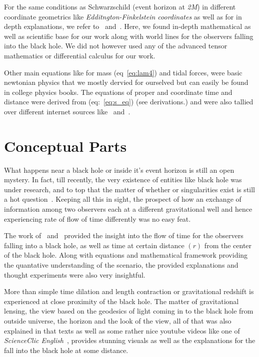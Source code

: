 For the same conditions as Schwarzschild (event horizon at \emph{2M}) in different coordinate geometrics like \emph{Edditngton-Finkelstein coordinates} as well as for in depth explanations, we refer to~\cite{hartle2003gravity} and~\cite{weinberg1972gravitation}. 
Here, we found in-depth mathematical as well as scientific base for our work along with world lines for the observers falling into the black hole. We did not however
used any of the advanced tensor mathematics or differential calculus for our work. 

Other main equations like for mass (eq~\ref{eq:lam4}) and tidal forces, were basic newtonian physics that we mostly dervied for ourselved but can easily be found 
in college physics books. The equations of proper and coordinate time and distance were derived from (eq:~\ref{eq:s_eq}) (see derivations.) and were also tallied 
over different internet sources like~\cite{dummiesgr_web} and~\cite{physicsforums_timedilation}. 

\section{Conceptual Parts}\label{sec:conceptual}

What happens near a black hole or inside it's event horizon is still an open mystery. In fact, till recently, the very existence of entities like black hole was
under research, and to top that the matter of whether or singularities exist is still a hot question~\cite{kerr2023blackholessingularities}. Keeping all this in 
sight, the prospect of how an exchange of information among two observers each at a different gravitational well and hence experiencing rate of flow of time
differently was no easy feat. 

The work of~\cite{hartle2003gravity} and~\cite{weinberg1972gravitation} provided the insight into the flow of time for the observers falling into a black hole, as well as 
time at certain distance \((r)\) from the center of the black hole. Along with equations and mathematical framework providing the quantative understanding 
of the scenario, the provided explanations and thought experiments were also very insightful. 

More than simple time dilation and length contraction or gravitational redshift is experienced at close proximity of the black hole. The matter of gravitational 
lensing, the view based on the geodesics of light coming in to the black hole from outside universe, the horizon and the look of the view, all of that was also explained 
in that texts as well as some rather nice youtube videos like one of \emph{ScienceClic English}~\cite{scienceclic_blackhole}, provides stunning visuals as well as the explanations 
for the fall into the black hole at some distance. 


